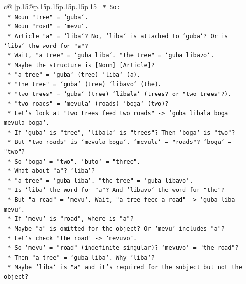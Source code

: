 \documentclass{article}
\begin{document}
{\begin{supertabular}{c@{$\;$}|p{.15\linewidth}@{}p{.15\linewidth}p{.15\linewidth}p{.15\linewidth}p{.15\linewidth}p{.15\linewidth}}
{{{\texttt{    *   So:} \\
\texttt{        *   Noun "tree" = `guba`.} \\
\texttt{        *   Noun "road" = `mevu`.} \\
\texttt{        *   Article "a" = `liba`? No, `liba` is attached to `guba`? Or is `liba` the word for "a"?} \\
\texttt{        *   Wait, "a tree" = `guba liba`. "the tree" = `guba libavo`.} \\
\texttt{        *   Maybe the structure is {[}Noun{]} {[}Article{]}?} \\
\texttt{        *   "a tree" = `guba` (tree) `liba` (a).} \\
\texttt{        *   "the tree" = `guba` (tree) `libavo` (the).} \\
\texttt{        *   "two trees" = `guba` (tree) `libala` (trees? or "two trees"?).} \\
\texttt{        *   "two roads" = `mevula` (roads) `boga` (two)?} \\
\texttt{        *   Let's look at "two trees feed two roads" {-}> `guba libala boga mevula boga`.} \\
\texttt{        *   If `guba` is "tree", `libala` is "trees"? Then `boga` is "two"?} \\
\texttt{        *   But "two roads" is `mevula boga`. `mevula` = "roads"? `boga` = "two"?} \\
\texttt{        *   So `boga` = "two". `buto` = "three".} \\
\texttt{        *   What about "a"? `liba`?} \\
\texttt{        *   "a tree" = `guba liba`. "the tree" = `guba libavo`.} \\
\texttt{        *   Is `liba` the word for "a"? And `libavo` the word for "the"?} \\
\texttt{        *   But "a road" = `mevu`. Wait, "a tree feed a road" {-}> `guba liba mevu`.} \\
\texttt{        *   If `mevu` is "road", where is "a"?} \\
\texttt{        *   Maybe "a" is omitted for the object? Or `mevu` includes "a"?} \\
\texttt{        *   Let's check "the road" {-}> `mevuvo`.} \\
\texttt{        *   So `mevu` = "road" (indefinite singular)? `mevuvo` = "the road"?} \\
\texttt{        *   Then "a tree" = `guba liba`. Why `liba`?} \\
\texttt{        *   Maybe `liba` is "a" and it's required for the subject but not the object?} \\
}}}
\end{supertabular}}
\end{document}
